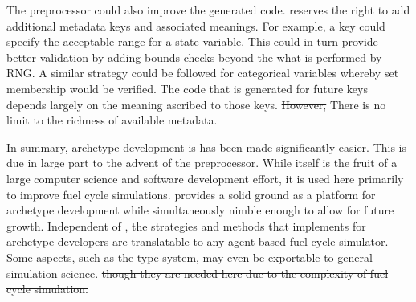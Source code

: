 The preprocessor could also improve the generated code. \Cyclus reserves the right
to add additional metadata keys and associated meanings.  For example, a 
key could specify the acceptable range for a state variable. This could in turn 
provide better validation by adding bounds checks beyond the what is performed
by \gls{RNG}. A similar strategy could be followed for categorical variables whereby
set membership would be verified. The code that is generated for future keys 
depends largely on the meaning ascribed to those keys. \sout{However, } There is no limit 
to the richness of available metadata.

In summary, archetype development is has been made significantly easier. This is due in large
part to the advent of the \cyclus preprocessor. While \cycpp itself is the fruit of
a large computer science and software development effort, it is used here 
primarily to improve fuel cycle simulations. \cyclus provides a solid ground 
as a platform for archetype development while simultaneously nimble enough
to allow for future growth. Independent of \cyclus, the strategies and methods that
\cyclus implements for archetype developers are translatable to any agent-based 
fuel cycle simulator.  Some aspects, such as the type system,  may even be exportable 
to general simulation science. \sout{ though they are needed here due to the complexity of 
fuel cycle simulation.}

